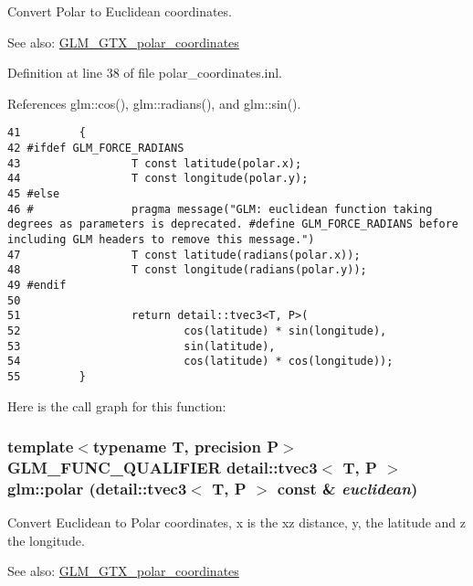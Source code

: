 Convert Polar to Euclidean coordinates.

\begin{Desc}
\item[See also:]\hyperlink{group__gtx__polar__coordinates}{GLM\_\-GTX\_\-polar\_\-coordinates} \end{Desc}


Definition at line 38 of file polar\_\-coordinates.inl.

References glm::cos(), glm::radians(), and glm::sin().

\begin{Code}\begin{verbatim}41         {
42 #ifdef GLM_FORCE_RADIANS
43                 T const latitude(polar.x);
44                 T const longitude(polar.y);
45 #else
46 #               pragma message("GLM: euclidean function taking degrees as parameters is deprecated. #define GLM_FORCE_RADIANS before including GLM headers to remove this message.")
47                 T const latitude(radians(polar.x));
48                 T const longitude(radians(polar.y));
49 #endif
50 
51                 return detail::tvec3<T, P>(
52                         cos(latitude) * sin(longitude),
53                         sin(latitude),
54                         cos(latitude) * cos(longitude));
55         }
\end{verbatim}
\end{Code}




Here is the call graph for this function:\hypertarget{group__gtx__polar__coordinates_g65a075c52ee1c699d77c4a98dd266006}{
\subsubsection[polar]{\setlength{\rightskip}{0pt plus 5cm}template$<$typename T, precision P$>$ GLM\_\-FUNC\_\-QUALIFIER detail::tvec3$<$ T, P $>$ glm::polar (detail::tvec3$<$ T, P $>$ const \& {\em euclidean})}}
\label{group__gtx__polar__coordinates_g65a075c52ee1c699d77c4a98dd266006}


Convert Euclidean to Polar coordinates, x is the xz distance, y, the latitude and z the longitude.

\begin{Desc}
\item[See also:]\hyperlink{group__gtx__polar__coordinates}{GLM\_\-GTX\_\-polar\_\-coordinates} \end{Desc}


